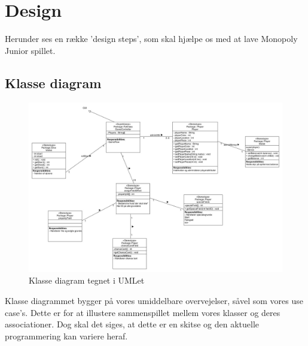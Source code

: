 \section{Design}
    Herunder ses en række 'design steps', som skal hjælpe os med at lave Monopoly 
    Junior spillet.

    \subsection{Klasse diagram}
            \begin{figure}[h]
                \advance\leftskip-3cm
                \includegraphics[width=20cm]{fig/Designklassediagram(3).jpg}
                \caption{Klasse diagram tegnet i UMLet}
            \end{figure}
        Klasse diagrammet bygger på vores umiddelbare overvejelser, såvel som vores use case's.
        Dette er for at illustere sammenspillet mellem vores klasser og deres associationer.
        Dog skal det siges, at dette er en skitse og den aktuelle programmering kan variere heraf.


